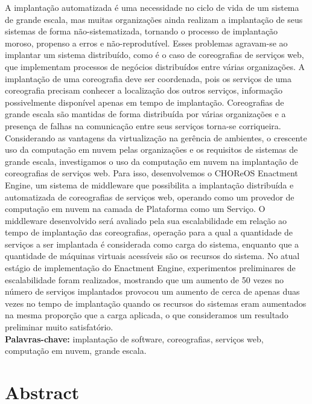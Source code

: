 \documentclass[11pt,twoside,a4paper]{book}
\newcommand\Leo[1]{\nb{Leo}{#1}}
\begin{document}
A implantação automatizada é uma necessidade no ciclo de vida de um sistema de grande escala, mas muitas organizações ainda realizam a implantação de seus sistemas de forma não-sistematizada, tornando o processo de implantação moroso, propenso a erros e não-reprodutível. Esses problemas agravam-se ao implantar um sistema distribuído, como é o caso de coreografias de serviços web, que implementam processos de negócios distribuídos entre várias organizações. A implantação de uma coreografia deve ser coordenada, pois os serviços de uma coreografia precisam conhecer a localização dos outros serviços, informação possivelmente disponível apenas em tempo de implantação. Coreografias de grande escala são mantidas de forma distribuída por várias organizações e a presença de falhas na comunicação entre seus serviços torna-se corriqueira. Considerando as vantagens da virtualização na gerência de ambientes, o crescente uso da computação em nuvem pelas organizações e os requisitos de sistemas de grande escala, investigamos o uso da computação em nuvem na implantação de coreografias de serviços web. Para isso, desenvolvemos o CHOReOS Enactment Engine, um sistema de middleware que possibilita a implantação distribuída e automatizada de coreografias de serviços web, operando como um provedor de computação em nuvem na camada de Plataforma como um Serviço. O middleware desenvolvido será avaliado pela sua escalabilidade em relação ao tempo de implantação das coreografias, operação para a qual a quantidade de serviços a ser implantada é considerada como carga do sistema, enquanto que a quantidade de máquinas virtuais acessíveis são os recursos do sistema. No atual estágio de implementação do Enactment Engine, experimentos preliminares de escalabilidade foram realizados, mostrando que um aumento de 50 vezes no número de serviços implantados provocou um aumento de cerca de apenas duas vezes no tempo de implantação quando os recursos do sistemas eram aumentados na mesma proporção que a carga aplicada, o que consideramos um resultado preliminar muito satisfatório.\\

\noindent \textbf{Palavras-chave:} implantação de software, coreografias, serviços web, computação em nuvem, grande escala.

\chapter*{Abstract}
\end{document}
